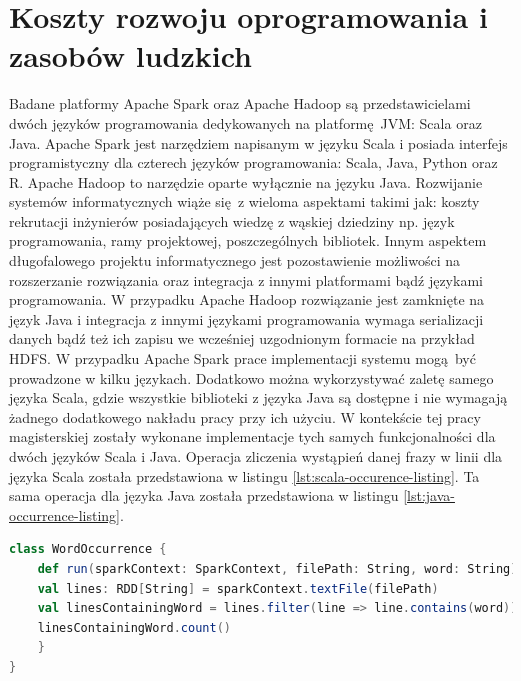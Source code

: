 \section{Koszty rozwoju oprogramowania i zasobów ludzkich}\label{development_human_resources}
Badane platformy Apache Spark oraz Apache Hadoop są przedstawicielami dwóch języków programowania dedykowanych na platformę JVM: Scala oraz Java. Apache Spark jest narzędziem napisanym w języku Scala i posiada interfejs programistyczny dla czterech języków programowania: Scala, Java, Python oraz R. Apache Hadoop to narzędzie oparte wyłącznie na języku Java. Rozwijanie systemów informatycznych wiąże się z wieloma aspektami takimi jak: koszty rekrutacji inżynierów posiadających wiedzę z wąskiej dziedziny np. język programowania, ramy projektowej, poszczególnych bibliotek. Innym aspektem długofalowego projektu informatycznego jest pozostawienie możliwości na rozszerzanie rozwiązania oraz integracja z innymi platformami bądź językami programowania. W przypadku Apache Hadoop rozwiązanie jest zamknięte na język Java i integracja z innymi językami programowania wymaga serializacji danych bądź też ich zapisu we wcześniej uzgodnionym formacie na przykład HDFS. W przypadku Apache Spark prace implementacji systemu mogą być prowadzone w kilku językach. Dodatkowo można wykorzystywać zaletę samego języka Scala, gdzie wszystkie biblioteki z języka Java są dostępne i nie wymagają żadnego dodatkowego nakładu pracy przy ich użyciu. W kontekście tej pracy magisterskiej zostały wykonane implementacje tych samych funkcjonalności dla dwóch języków Scala i Java. Operacja zliczenia wystąpień danej frazy w linii dla języka Scala została przedstawiona w listingu \ref{lst:scala-occurence-listing}. Ta sama operacja dla języka Java została przedstawiona w listingu \ref{lst:java-occurrence-listing}.
\begin{lstlisting}[language=scala, caption={Operacja zliczania wystąpień danej frazy w linii dla języka Scala na platformie Apache Spark},captionpos=b, label={lst:scala-occurence-listing}]
class WordOccurrence {
	def run(sparkContext: SparkContext, filePath: String, word: String) = {
	val lines: RDD[String] = sparkContext.textFile(filePath)
	val linesContainingWord = lines.filter(line => line.contains(word))
	linesContainingWord.count()
	}
}
\end{lstlisting}
